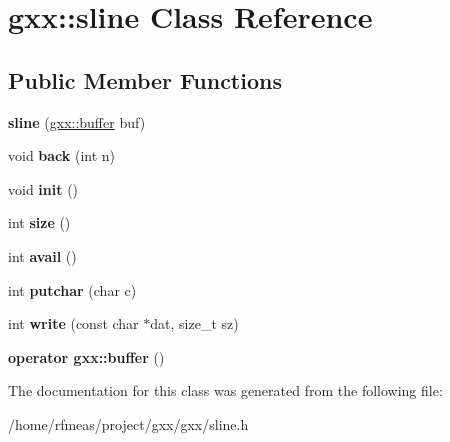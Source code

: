 \hypertarget{classgxx_1_1sline}{}\section{gxx\+:\+:sline Class Reference}
\label{classgxx_1_1sline}
\subsection*{Public Member Functions}
\begin{DoxyCompactItemize}
\item 
{\bfseries sline} (\hyperlink{classgxx_1_1buffer}{gxx\+::buffer} buf)\hypertarget{classgxx_1_1sline_ac697414d1e5130785cb711152e65276c}{}\label{classgxx_1_1sline_ac697414d1e5130785cb711152e65276c}

\item 
void {\bfseries back} (int n)\hypertarget{classgxx_1_1sline_a89ed8cc97e6deb68f68f5c21fe05b7a2}{}\label{classgxx_1_1sline_a89ed8cc97e6deb68f68f5c21fe05b7a2}

\item 
void {\bfseries init} ()\hypertarget{classgxx_1_1sline_a2eeb132f9b122fd45c9a21cf965a24d0}{}\label{classgxx_1_1sline_a2eeb132f9b122fd45c9a21cf965a24d0}

\item 
int {\bfseries size} ()\hypertarget{classgxx_1_1sline_acdd67802936665410340922ba682a985}{}\label{classgxx_1_1sline_acdd67802936665410340922ba682a985}

\item 
int {\bfseries avail} ()\hypertarget{classgxx_1_1sline_a87822e3f40ae62ac6de8b9641304fa2f}{}\label{classgxx_1_1sline_a87822e3f40ae62ac6de8b9641304fa2f}

\item 
int {\bfseries putchar} (char c)\hypertarget{classgxx_1_1sline_a2f37162f3881954b2df70557f89ed9d7}{}\label{classgxx_1_1sline_a2f37162f3881954b2df70557f89ed9d7}

\item 
int {\bfseries write} (const char $\ast$dat, size\+\_\+t sz)\hypertarget{classgxx_1_1sline_aa3c308dddffb79ce04da2fc18d77cc0b}{}\label{classgxx_1_1sline_aa3c308dddffb79ce04da2fc18d77cc0b}

\item 
{\bfseries operator gxx\+::buffer} ()\hypertarget{classgxx_1_1sline_af4e3d56c60ed25063cd5387f350114bd}{}\label{classgxx_1_1sline_af4e3d56c60ed25063cd5387f350114bd}

\end{DoxyCompactItemize}


The documentation for this class was generated from the following file\+:\begin{DoxyCompactItemize}
\item 
/home/rfmeas/project/gxx/gxx/sline.\+h\end{DoxyCompactItemize}
